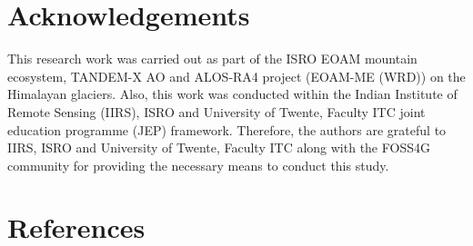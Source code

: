 \documentclass[review]{elsarticle}
\numberwithin{equation}{section}
\numberwithin{figure}{section}
\numberwithin{table}{section}
\begin{document}
\section*{Acknowledgements}
This research work was carried out as part of the ISRO EOAM mountain ecosystem, TANDEM-X AO and ALOS-RA4 project (EOAM-ME (WRD)) on the Himalayan glaciers. Also, this work was conducted within the Indian Institute of Remote Sensing (IIRS), ISRO and University of Twente, Faculty ITC joint education programme (JEP) framework. Therefore, the authors are grateful to IIRS, ISRO and University of Twente, Faculty ITC along with the FOSS4G community for providing the necessary means to conduct this study.  
\section*{References}


\end{document}
